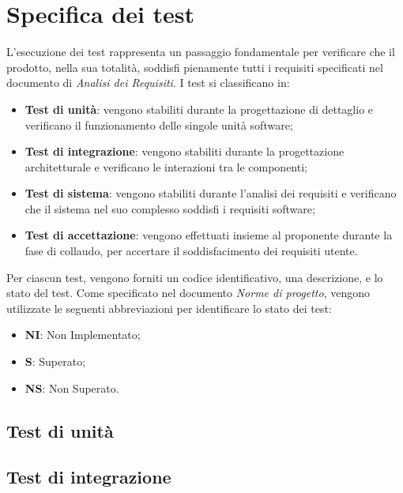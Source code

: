 \section{Specifica dei test}
L'esecuzione dei test rappresenta un passaggio fondamentale per verificare che 
il prodotto, nella sua totalità, soddisfi pienamente tutti i requisiti specificati
nel documento di \textit{Analisi dei Requisiti}.
I test si classificano in:
\begin{itemize}
    \item \textbf{Test di unità}: vengono stabiliti durante la progettazione di
    dettaglio e verificano il funzionamento delle singole unità software;
    \item \textbf{Test di integrazione}: vengono stabiliti durante la progettazione
    architetturale e verificano le interazioni tra le componenti;
    \item \textbf{Test di sistema}: vengono stabiliti durante l'analisi dei requisiti
    e verificano che il sistema nel suo complesso soddisfi i requisiti software;
    \item \textbf{Test di accettazione}: vengono effettuati insieme al proponente 
    durante la fase di collaudo, per accertare il soddisfacimento dei requisiti utente.
\end{itemize}
Per ciascun test, vengono forniti un codice identificativo, una descrizione, e
lo stato del test. 
Come specificato nel documento \textit{Norme di progetto}, vengono utilizzate le seguenti 
abbreviazioni per identificare lo stato dei test:
\begin{itemize}
    \item \textbf{NI}: Non Implementato;
    \item \textbf{S}: Superato;
    \item \textbf{NS}: Non Superato.
\end{itemize}


\subsection{Test di unità}
\subsection{Test di integrazione}
